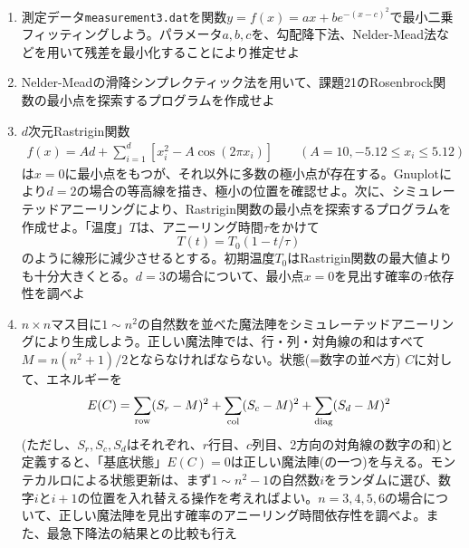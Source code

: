 \documentclass[11pt]{jarticle}
\begin{document}
\begin{enumerate}
\item 測定データ{\tt measurement3.dat}を関数$y=f(x)=ax+be^{−(x−c)^2}$で最小二乗フィッティングしよう。パラメータ$a, b, c$を、勾配降下法、Nelder-Mead法などを用いて残差を最小化することにより推定せよ
  \begin{center}
  \end{center}
  
\item Nelder-Meadの滑降シンプレクティック法を用いて、課題21のRosenbrock関数の最小点を探索するプログラムを作成せよ

\item $d$次元Rastrigin関数
  \begin{align*}
    f(x) = Ad+\sum_{i=1}^d [x_i^2 - A \cos (2 \pi x_i)] \qquad (A=10, -5.12 \le x_{i} \le 5.12)
  \end{align*}
  は$x=0$に最小点をもつが、それ以外に多数の極小点が存在する。Gnuplotにより$d=2$の場合の等高線を描き、極小の位置を確認せよ。次に、シミュレーテッドアニーリングにより、Rastrigin関数の最小点を探索するプログラムを作成せよ。「温度」$T$は、アニーリング時間$\tau$をかけて
  \[
  T(t) = T_0 (1 - t/\tau)
  \]
  のように線形に減少させるとする。初期温度$T_0$はRastrigin関数の最大値よりも十分大きくとる。$d=3$の場合について、最小点$x=0$を見出す確率の$\tau$依存性を調べよ

\item $n \times n$マス目に$1\sim n^2$の自然数を並べた魔法陣をシミュレーテッドアニーリングにより生成しよう。正しい魔法陣では、行・列・対角線の和はすべて$M = n(n^2+1)/2$とならなければならない。状態(=数字の並べ方) $C$に対して、エネルギーを
  \[
  E(C) = \sum_{\rm row} (S_r-M)^2 + \sum_{\rm col} (S_c-M)^2 + \sum_{\rm diag} (S_d-M)^2
  \]
  (ただし、$S_r, S_c, S_d$はそれぞれ、$r$行目、$c$列目、2方向の対角線の数字の和)と定義すると、「基底状態」$E(C)=0$は正しい魔法陣(の一つ)を与える。モンテカルロによる状態更新は、まず$1\sim n^2-1$の自然数$i$をランダムに選び、数字$i$と$i+1$の位置を入れ替える操作を考えればよい。$n=3,4,5,6$の場合について、正しい魔法陣を見出す確率のアニーリング時間依存性を調べよ。また、最急下降法の結果との比較も行え
  

\end{enumerate}
\end{document}

